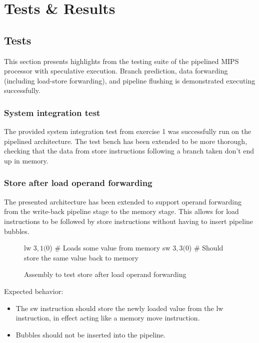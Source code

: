 \chapter{Tests \& Results}

\section{Tests}

This section presents highlights from the testing suite of the pipelined MIPS processor with speculative execution. Branch prediction, data forwarding (including load-store forwarding), and pipeline flushing is demonstrated executing successfully.

\subsection{System integration test}

The provided system integration test from exercise 1 was successfully run on the pipelined architecture.
The test bench has been extended to be more thorough, checking that the data from store instructions following a branch taken don't end up in memory.

\subsection{Store after load operand forwarding}

The presented architecture has been extended to support operand forwarding from the write-back pipeline stage to the memory stage.
This allows for load instructions to be followed by store instructions without having to insert pipeline bubbles.

\begin{figure}[h]
  \begin{code}
    lw $3, 1($0)     # Loads some value from memory
    sw $3, 3($0)     # Should store the same value back to memory
  \end{code}
  \caption{Assembly to test store after load operand forwarding}
  \label{fig:test-store-after-load}
\end{figure}

Expected behavior:
\begin{itemize}
  \item
    The sw instruction should store the newly loaded value from the lw instruction, in effect acting like a memory move instruction.
  \item
    Bubbles should not be inserted into the pipeline.
\end{itemize}

